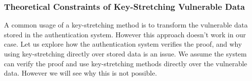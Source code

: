 %
%

\subsubsection{Theoretical Constraints of Key-Stretching Vulnerable Data}
A common usage of a key-stretching method is to transform the vulnerable data stored in the authentication system.
However this approach doesn't work in our case.
Let us explore how the authentication system verifies the proof, and why using key-stretching directly over stored data is an issue.
We assume the system can verify the proof and use key-stretching methods directly over the vulnerable data. 
However we will see why this is not possible.

\newpage
